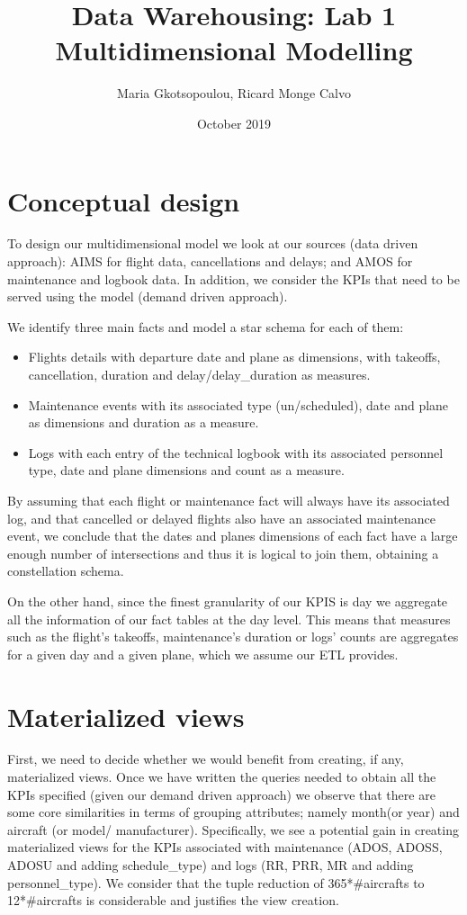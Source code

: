 \documentclass{article} %
\title{Data Warehousing: Lab 1 Multidimensional Modelling}
\author{Maria Gkotsopoulou, Ricard Monge Calvo}
\date{October 2019}
\begin{document}
\maketitle

\section{Conceptual design}

To design our multidimensional model we look at our sources (data driven approach): AIMS for flight data, cancellations and delays; and AMOS for maintenance and logbook data. In addition, we consider the KPIs that need to be served using the model (demand driven approach).
\par
We identify three main facts and model a star schema for each of them:
\begin{itemize}
    \item Flights details with departure date and plane as dimensions, with takeoffs, cancellation, duration and delay/delay\_duration as measures.
    \item Maintenance events with its associated type (un/scheduled), date and plane as dimensions and duration as a measure.
    \item Logs with each entry of the technical logbook with its associated personnel type, date and plane dimensions and count as a measure.
\end{itemize}

By assuming that each flight or maintenance fact will always have its associated log, and that cancelled or delayed flights also have an associated maintenance event, we conclude that the dates and planes dimensions of each fact have a large enough number of intersections and thus it is logical to join them, obtaining a constellation schema.
\par
On the other hand, since the finest granularity of our KPIS is day we aggregate all the information of our fact tables at the day level. This means that measures such as the flight's takeoffs, maintenance's duration or logs' counts are aggregates for a given day and a given plane, which we assume our ETL provides.

\section{Materialized views}

First, we need to decide whether we would benefit from creating, if any, materialized views. Once we have written the queries needed to obtain all the KPIs specified (given our demand driven approach) we observe that there are some core similarities in terms of grouping attributes; namely month(or year) and aircraft (or model/ manufacturer). Specifically, we see a potential gain in creating materialized views for the KPIs associated with maintenance (ADOS, ADOSS, ADOSU and adding schedule\_type) and logs (RR, PRR, MR and adding personnel\_type). We consider that the tuple reduction of 365*\#aircrafts to 12*\#aircrafts is considerable and justifies the view creation.
\end{document}
